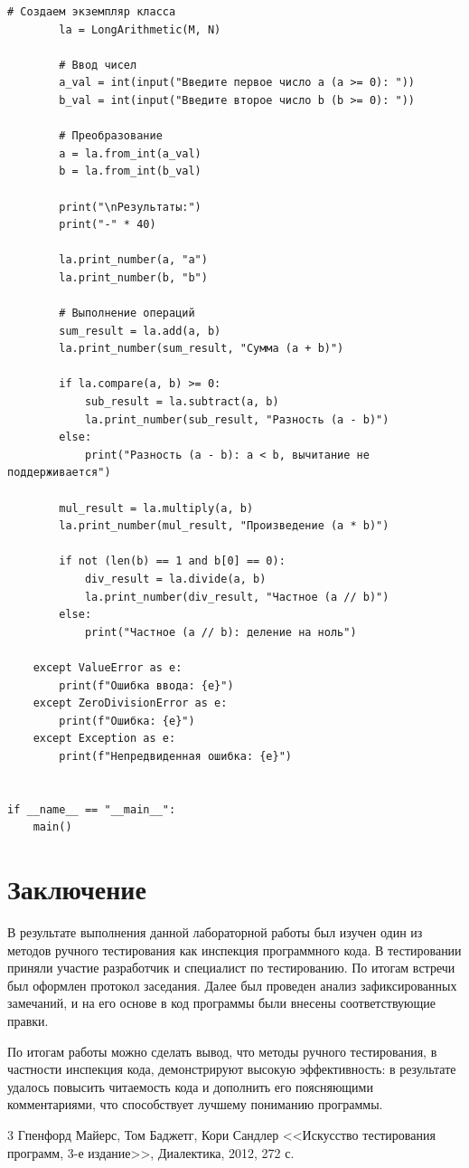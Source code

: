 \documentclass{article}[14pt]
\begin{document}
\begin{lstlisting}[caption={Код исправленной программы}, label=lst:fixed-code]
        # Создаем экземпляр класса
        la = LongArithmetic(M, N)
        
        # Ввод чисел
        a_val = int(input("Введите первое число a (a >= 0): "))
        b_val = int(input("Введите второе число b (b >= 0): "))
        
        # Преобразование
        a = la.from_int(a_val)
        b = la.from_int(b_val)
        
        print("\nРезультаты:")
        print("-" * 40)
        
        la.print_number(a, "a")
        la.print_number(b, "b")
        
        # Выполнение операций
        sum_result = la.add(a, b)
        la.print_number(sum_result, "Сумма (a + b)")
        
        if la.compare(a, b) >= 0:
            sub_result = la.subtract(a, b)
            la.print_number(sub_result, "Разность (a - b)")
        else:
            print("Разность (a - b): a < b, вычитание не поддерживается")
        
        mul_result = la.multiply(a, b)
        la.print_number(mul_result, "Произведение (a * b)")
        
        if not (len(b) == 1 and b[0] == 0):
            div_result = la.divide(a, b)
            la.print_number(div_result, "Частное (a // b)")
        else:
            print("Частное (a // b): деление на ноль")
            
    except ValueError as e:
        print(f"Ошибка ввода: {e}")
    except ZeroDivisionError as e:
        print(f"Ошибка: {e}")
    except Exception as e:
        print(f"Непредвиденная ошибка: {e}")


if __name__ == "__main__":
    main()
\end{lstlisting}

\pagebreak

\section{Заключение}

В результате выполнения данной лабораторной работы был изучен один из методов ручного тестирования как инспекция программного кода. В тестировании приняли участие разработчик и специалист по тестированию. По итогам встречи был оформлен протокол заседания. Далее был проведен анализ зафиксированных замечаний, и на его основе в код программы были внесены соответствующие правки.

По итогам работы можно сделать вывод, что методы ручного тестирования, в частности инспекция кода, демонстрируют высокую эффективность: в результате удалось повысить читаемость кода и дополнить его поясняющими комментариями, что способствует лучшему пониманию программы.

\pagebreak

\begin{thebibliography}{3}
	\bibitem{[1]} Гпенфорд Майерс, Том Баджетг, Кори Сандлер <<Искусство тестирования программ, 3-е издание>>, Диалектика, 2012, 272 с.
\end{thebibliography}
\end{document}
